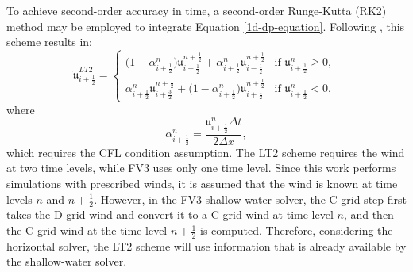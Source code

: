 \documentclass[preprint,12pt]{elsarticle}
\begin{document}
\begin{linenumbers}
To achieve second-order accuracy in time, a second-order Runge-Kutta (RK2) method may be employed to integrate Equation \eqref{1d-dp-equation}. Following \cite{durran:2010}, this scheme results in:
\begin{equation}
	\tilde{\mathfrak{u}}^{LT2}_{i+\frac{1}{2}} =
	\begin{cases}
		\big(1-\alpha_{i+\frac{1}{2}}^n \big)\mathfrak{\mathfrak{u}}^{n+\frac{1}{2}}_{i+\frac{1}{2}} +
		\alpha_{i+\frac{1}{2}}^n \mathfrak{u}^{n+\frac{1}{2}}_{i-\frac{1}{2}} & \text{if } {\mathfrak{u}}^n_{i+\frac{1}{2}}\geq 0,\\
		\alpha_{i+\frac{1}{2}}^n \mathfrak{u}^{n+\frac{1}{2}}_{i+\frac{3}{2}} + \big(1-\alpha_{i+\frac{1}{2}}^n\big)
		\mathfrak{u}^{n+\frac{1}{2}}_{i+\frac{1}{2}} & \text{if } {\mathfrak{u}}^n_{i+\frac{1}{2}} < 0,\
	\end{cases}
\end{equation}
where $$\alpha_{i+\frac{1}{2}}^n = \frac{\mathfrak{u}_{i+\frac{1}{2}}^n\Delta t}{2\Delta x},$$ which requires the CFL condition assumption.
The LT2 scheme requires the wind at two time levels, while FV3 uses only one time level. 
Since this work performs simulations with prescribed winds, it is  assumed that the wind is known at time levels $n$ and $n+\frac{1}{2}$.
However, in the FV3 shallow-water solver, the C-grid step first takes the D-grid wind and convert it to a C-grid wind at time level $n$, and then the  C-grid wind at the time level $n+\frac{1}{2}$ is computed.
Therefore, considering the horizontal solver, the LT2 scheme will use information that is already available by the shallow-water solver.


\end{linenumbers}
\end{document}
